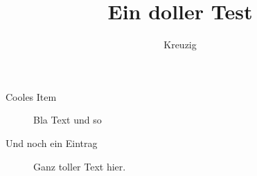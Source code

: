 \documentclass[a4paper,DIV15,12pt]{article}
\title{Ein doller Test}
\author{Kreuzig}
\begin{document}
\maketitle
\newpage
\tableofcontents
\newpage

\begin{description}
	\item[Cooles Item]
	Bla Text und so
	
	\item[Und noch ein Eintrag]
	Ganz toller Text hier.
\end{description}
\end{document}
